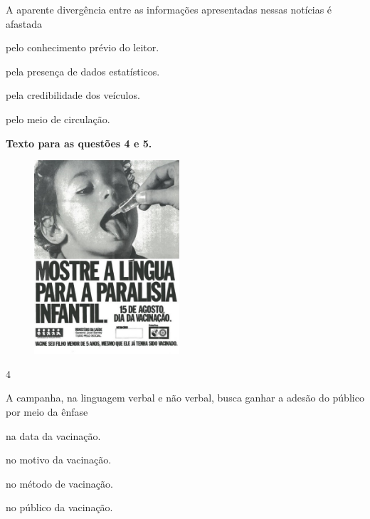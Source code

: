 
A aparente divergência entre as informações apresentadas nessas notícias
é afastada

\begin{escolha}
\item pelo conhecimento prévio do leitor.

\item pela presença de dados estatísticos.

\item pela credibilidade dos veículos.

\item pelo meio de circulação.
\end{escolha}

\textbf{Texto para as questões 4 e 5.}

\begin{figure}
\centering
\includegraphics[width=2.12879in,height=2.83333in]{./imgSAEB_8_POR/media/image39.jpeg}
\end{figure}


\num{4}

A campanha, na linguagem verbal e não verbal, busca ganhar a adesão do
público por meio da ênfase

\begin{escolha}
\item na data da vacinação.

\item no motivo da vacinação.

\item no método de vacinação.

\item no público da vacinação.
\end{escolha}



